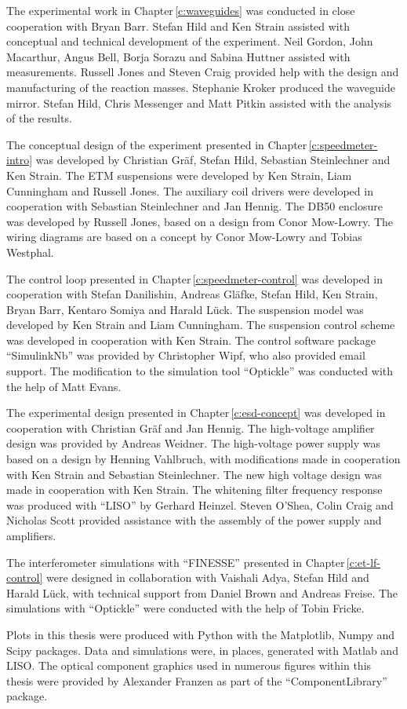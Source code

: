 The experimental work in Chapter\,\ref{c:waveguides} was conducted in close cooperation with Bryan Barr. Stefan Hild and Ken Strain assisted with conceptual and technical development of the experiment. Neil Gordon, John Macarthur, Angus Bell, Borja Sorazu and Sabina Huttner assisted with measurements. Russell Jones and Steven Craig provided help with the design and manufacturing of the reaction masses. Stephanie Kroker produced the waveguide mirror. Stefan Hild, Chris Messenger and Matt Pitkin assisted with the analysis of the results.

The conceptual design of the experiment presented in Chapter\,\ref{c:speedmeter-intro} was developed by Christian Gr\"{a}f, Stefan Hild, Sebastian Steinlechner and Ken Strain. The ETM suspensions were developed by Ken Strain, Liam Cunningham and Russell Jones. The auxiliary coil drivers were developed in cooperation with Sebastian Steinlechner and Jan Hennig. The DB50 enclosure was developed by Russell Jones, based on a design from Conor Mow-Lowry. The wiring diagrams are based on a concept by Conor Mow-Lowry and Tobias Westphal.

The control loop presented in Chapter\,\ref{c:speedmeter-control} was developed in cooperation with Stefan Danilishin, Andreas Gl\"{a}fke, Stefan Hild, Ken Strain, Bryan Barr, Kentaro Somiya and Harald L\"{u}ck. The suspension model was developed by Ken Strain and Liam Cunningham. The suspension control scheme was developed in cooperation with Ken Strain. The control software package ``SimulinkNb'' was provided by Christopher Wipf, who also provided email support. The modification to the simulation tool ``Optickle'' was conducted with the help of Matt Evans.

The experimental design presented in Chapter\,\ref{c:esd-concept} was developed in cooperation with Christian Gr\"{a}f and Jan Hennig. The high-voltage amplifier design was provided by Andreas Weidner. The high-voltage power supply was based on a design by Henning Vahlbruch, with modifications made in cooperation with Ken Strain and Sebastian Steinlechner. The new high voltage design was made in cooperation with Ken Strain. The whitening filter frequency response was produced with ``LISO'' by Gerhard Heinzel. Steven O'Shea, Colin Craig and Nicholas Scott provided assistance with the assembly of the power supply and amplifiers.

The interferometer simulations with ``FINESSE'' presented in Chapter\,\ref{c:et-lf-control} were designed in collaboration with Vaishali Adya, Stefan Hild and Harald L\"{u}ck, with technical support from Daniel Brown and Andreas Freise. The simulations with ``Optickle'' were conducted with the help of Tobin Fricke.

Plots in this thesis were produced with Python with the Matplotlib, Numpy and Scipy packages. Data and simulations were, in places, generated with Matlab and LISO. The optical component graphics used in numerous figures within this thesis were provided by Alexander Franzen as part of the ``ComponentLibrary'' package.